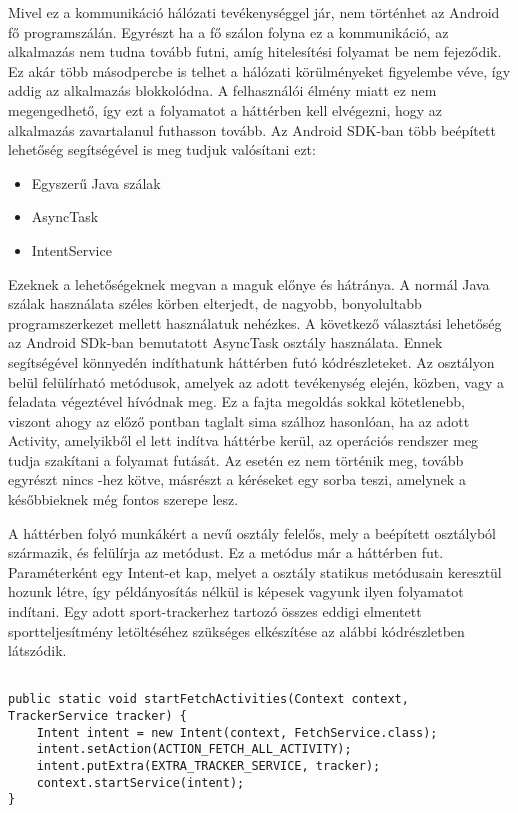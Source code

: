 Mivel ez a kommunikáció hálózati tevékenységgel jár, nem történhet az Android fő programszálán. 
Egyrészt ha a fő szálon folyna ez a kommunikáció, az alkalmazás nem tudna tovább futni, amíg hitelesítési folyamat be nem fejeződik. 
Ez akár több másodpercbe is telhet a hálózati körülményeket figyelembe véve, így addig az alkalmazás blokkolódna. 
A felhasználói élmény miatt ez nem megengedhető, így ezt a folyamatot a háttérben kell elvégezni, hogy az alkalmazás zavartalanul futhasson tovább. 
Az Android SDK-ban több beépített lehetőség segítségével is meg tudjuk valósítani ezt:

\begin{itemize}
	\item Egyszerű Java szálak 
	\item AsyncTask 
	\item IntentService 
\end{itemize}

Ezeknek a lehetőségeknek megvan a maguk előnye és hátránya. 
A normál Java szálak használata széles körben elterjedt, de nagyobb, bonyolultabb programszerkezet mellett használatuk nehézkes. 
A következő választási lehetőség az Android SDk-ban bemutatott AsyncTask osztály használata. 
Ennek segítségével könnyedén indíthatunk háttérben futó kódrészleteket. 
Az osztályon belül felülírható metódusok, amelyek az adott tevékenység elején, közben, vagy a feladata végeztével hívódnak meg. 
Ez a fajta megoldás sokkal kötetlenebb, viszont ahogy az előző pontban taglalt sima szálhoz hasonlóan, ha az adott Activity, amelyikből el lett indítva háttérbe kerül, az operációs rendszer meg tudja szakítani a folyamat futását. 
Az  esetén ez nem történik meg, tovább egyrészt nincs -hez kötve, másrészt a kéréseket egy sorba teszi, amelynek a későbbieknek még fontos szerepe lesz. 

A háttérben folyó munkákért a  nevű osztály felelős, mely a beépített  osztályból származik, és felülírja az  metódust. 
Ez a metódus már a háttérben fut. Paraméterként egy Intent-et kap, melyet a  osztály statikus metódusain keresztül hozunk létre, így példányosítás nélkül is képesek vagyunk ilyen folyamatot indítani. 
Egy adott sport-trackerhez tartozó összes eddigi elmentett sportteljesítmény letöltéséhez szükséges  elkészítése az alábbi kódrészletben látszódik. 

\begin{lstlisting}

public static void startFetchActivities(Context context, TrackerService tracker) {
	Intent intent = new Intent(context, FetchService.class);
	intent.setAction(ACTION_FETCH_ALL_ACTIVITY);
	intent.putExtra(EXTRA_TRACKER_SERVICE, tracker);
	context.startService(intent);
}

\end{lstlisting}

